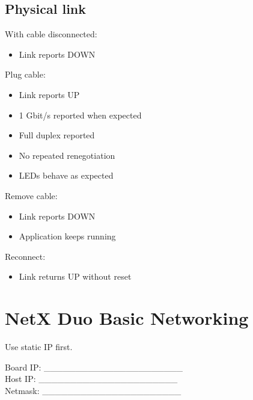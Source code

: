 \documentclass[10pt,a4paper,oneside]{report}
\providecommand{\tightlist}{\setlength{\itemsep}{1pt}\setlength{\parskip}{1pt}}
\begin{document}
\subsection{Physical link}\label{wiki-hardware-bring-up-and-testing--102-physical-link}

With cable disconnected:

\begin{itemize}
\tightlist
\item[$\square$]
  Link reports DOWN
\end{itemize}

Plug cable:

\begin{itemize}
\tightlist
\item[$\square$]
  Link reports UP
\item[$\square$]
  1 Gbit/s reported when expected
\item[$\square$]
  Full duplex reported
\item[$\square$]
  No repeated renegotiation
\item[$\square$]
  LEDs behave as expected
\end{itemize}

Remove cable:

\begin{itemize}
\tightlist
\item[$\square$]
  Link reports DOWN
\item[$\square$]
  Application keeps running
\end{itemize}

Reconnect:

\begin{itemize}
\tightlist
\item[$\square$]
  Link returns UP without reset
\end{itemize}

\section{NetX Duo Basic Networking}\label{wiki-hardware-bring-up-and-testing--11-netx-duo-basic-networking}

Use static IP first.

Board IP: \_\_\_\_\_\_\_\_\_\_\_\_\_\_\_\_\_\_\_\_\_\_\\
Host IP: \_\_\_\_\_\_\_\_\_\_\_\_\_\_\_\_\_\_\_\_\_\_\\
Netmask: \_\_\_\_\_\_\_\_\_\_\_\_\_\_\_\_\_\_\_\_\_\_
\end{document}
